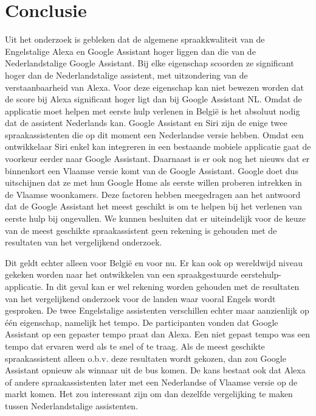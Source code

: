 
\chapter{Conclusie}
\label{ch:conclusie}

Uit het onderzoek is gebleken dat de algemene spraakkwaliteit van de Engelstalige Alexa en Google Assistant hoger liggen dan die van de Nederlandstalige Google Assistant. Bij elke eigenschap scoorden ze significant hoger dan de Nederlandstalige assistent, met uitzondering van de verstaanbaarheid van Alexa. Voor deze eigenschap kan niet bewezen worden dat de score bij Alexa significant hoger ligt dan bij Google Assistant NL.
Omdat de applicatie moet helpen met eerste hulp verlenen in België is het absoluut nodig dat de assistent Nederlands kan. Google Assistant en Siri zijn de enige twee spraakassistenten die op dit moment een Nederlandse versie hebben. Omdat een ontwikkelaar Siri enkel kan integreren in een bestaande mobiele applicatie gaat de voorkeur eerder naar Google Assistant. Daarnaast is er ook nog het nieuws dat er binnenkort een Vlaamse versie komt van de Google Assistant. Google doet dus uitschijnen dat ze met hun Google Home als eerste willen proberen intrekken in de Vlaamse woonkamers. Deze factoren hebben meegedragen aan het antwoord dat de Google Assistant het meest geschikt is om te helpen bij het verlenen van eerste hulp bij ongevallen. We kunnen besluiten dat er uiteindelijk voor de keuze van de meest geschikte spraakassistent geen rekening is gehouden met de resultaten van het vergelijkend onderzoek.

Dit geldt echter alleen voor België en voor nu. Er kan ook op wereldwijd niveau gekeken worden naar het ontwikkelen van een spraakgestuurde eerstehulp-applicatie. In dit geval kan er wel rekening worden gehouden met de resultaten van het vergelijkend onderzoek voor de landen waar vooral Engels wordt gesproken. De twee Engelstalige assistenten verschillen echter maar aanzienlijk op één eigenschap, namelijk het tempo. De participanten vonden dat Google Assistant op een gepaster tempo praat dan Alexa. Een niet gepast tempo was een tempo dat ervaren werd als te snel of te traag. Als de meest geschikte spraakassistent alleen o.b.v. deze resultaten wordt gekozen, dan zou Google Assistant opnieuw als winnaar uit de bus komen. De kans bestaat ook dat Alexa of andere spraakassistenten later met een Nederlandse of Vlaamse versie op de markt komen. Het zou interessant zijn om dan dezelfde vergelijking te maken tussen Nederlandstalige assistenten. 

